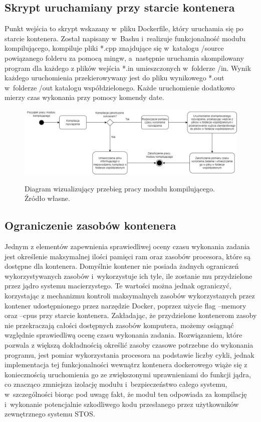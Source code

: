 \subsection{Skrypt uruchamiany przy starcie kontenera}
Punkt wejścia to skrypt wskazany w~pliku Dockerfile, który uruchamia się po starcie kontenera. Został napisany w~Bashu i~realizuje funkcjonalność modułu kompilującego, kompiluje pliki *.cpp znajdujące się w~katalogu /source powiązanego folderu za pomocą mingw, a~następnie uruchamia skompilowany program dla każdego z plików wejścia *.in umieszczonych w~folderze /in. Wynik każdego uruchomienia przekierowywany jest do  pliku wynikowego *.out w~folderze /out katalogu współdzielonego. Każde uruchomienie dodatkowo mierzy czas wykonania przy pomocy komendy date.
\begin{figure}[!ht]
	\begin{center}
		\resizebox{1\textwidth}{!} {
			\includegraphics{img/3/diagram-aktywnosci-modul-kompilujacy.png}
		}
		\caption[Diagram aktywności modułu kompilującego]{Diagram wizualizujący przebieg pracy modułu kompilującego. Źródło własne.}
		\label{diagram-aktywnosci-worker}
	\end{center}
\end{figure}

\subsection{Ograniczenie zasobów kontenera}
Jednym z elementów zapewnienia sprawiedliwej oceny czasu wykonania zadania jest określenie maksymalnej ilości pamięci ram oraz zasobów procesora, które są dostępne dla kontenera. Domyślnie kontener nie posiada żadnych ograniczeń wykorzystywanych zasobów i~wykorzystuje ich tyle, ile zostanie mu przydzielone przez jądro systemu macierzystego. Te wartości można jednak ograniczyć, korzystając z mechanizmu kontroli maksymalnych zasobów wykorzystanych przez kontener udostępnionego przez narzędzie Docker\cite{dockerConstraints}, poprzez użycie flag --memory oraz --cpus przy starcie kontenera. Zakładając, że przydzielone kontenerom zasoby nie przekraczają całości dostępnych zasobów komputera, możemy osiągnąć względnie sprawiedliwą ocenę czasu wykonania zadania. Rozwiązaniem, które pozwala z większą dokładnością określić zasoby czasowe potrzebne do wykonania programu, jest pomiar wykorzystania procesora na podstawie liczby cykli, jednak implementacja tej funkcjonalności wewnątrz kontenera dockerowego wiąże się z koniecznością uruchomienia go ze zwiększonymi uprawnieniami do funkcji jądra, co znacząco zmniejsza izolację modułu i~bezpieczeństwo całego systemu, w~szczególności biorąc pod uwagę fakt, że moduł ten odpowiada za kompilację i~wykonanie potencjalnie szkodliwego kodu przesłanego przez użytkowników zewnętrznego systemu STOS.

